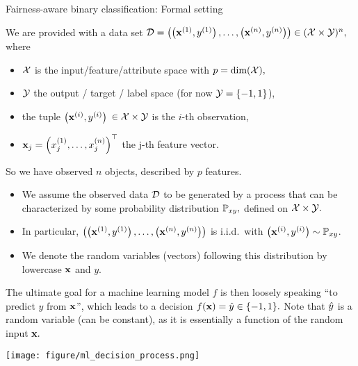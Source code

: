 \documentclass[11pt,compress,t,notes=noshow, xcolor=table]{beamer}
\begin{document}
\begin{vbframe}{Fairness-aware binary classification: Formal setting}
%	
\scriptsize{
%
We are provided with a data set 
%
$\mathcal{D} = \left( \left(\mathbf{x}^{(1)}, y^{(1)}\right), \ldots, \left(\mathbf{x}^{(n)}, y^{(n)}\right)\right) \in (\mathcal{X} \times \mathcal{Y})^n,$
%
where 
%
\begin{itemize}
%	
	\item $\mathcal{X}$ is the input/feature/attribute space with $p = \text{dim}(\mathcal{X}),$ 
%	
	\item $\mathcal{Y}$ the output / target / label space (for now $\mathcal{Y} = \{-1,1\}$),
%	
	\item the tuple \(\left(\mathbf{x}^{(i)}, y^{(i)}\right)\) $\in \mathcal{X}\times \mathcal{Y}$ is the \(i\)-th observation,
%	
	\item $\mathbf{x}_j = \left(x^{(1)}_j, \ldots, x^{(n)}_j\right)^\top$ the j-th feature vector.
%	
\end{itemize}
%
So we have observed $n$ objects, described by $p$ features.
%
\begin{itemize}
%	
	\item We assume the observed data $\mathcal{D}$ to be generated by a process that can
	be characterized by some probability distribution $\mathbb{P}_{xy},$ defined on 
	$\mathcal{X} \times \mathcal{Y}.$
%	
	\item In particular, $\left( \left(\mathbf{x}^{(1)}, y^{(1)}\right), \ldots, \left(\mathbf{x}^{(n)}, y^{(n)}\right)\right)$ is i.i.d.\ with $\left(\mathbf{x}^{(i)}, y^{(i)}\right)\sim\mathbb{P}_{xy} $.
%	
	\item We denote the random variables (vectors) following this 
	distribution by lowercase $\mathbf{x}$ and $y$.
%	
\end{itemize}
%
\begin{minipage}{0.5\textwidth}
%	
	The ultimate goal for a machine learning model $f$ is then loosely speaking ``to predict $y$ from $\mathbf{x}$'', which leads to a decision $f(\mathbf{x}) = \hat{y} \in \{-1,1\}.$ Note that $\hat{y}$ is a random variable (can be constant), as it is essentially a function of the random input $\mathbf{x}.$
%	
\end{minipage}
\begin{minipage}{0.45\textwidth}
	\begin{center}
		\texttt{[image: figure/ml\_decision\_process.png]}
	\end{center}
\end{minipage}
}
\end{vbframe}
\end{document}
